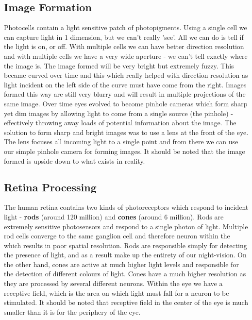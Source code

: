 \documentclass{article}
\begin{document}
	\subsection{Image Formation}
	Photocells contain a light sensitive patch of photopigments. Using a single cell we can capture light in 1 dimension, but we can't really 'see'. All we can do is tell if the light is on, or off. With multiple cells we can have better direction resolution and with multiple cells we have a very wide aperture - we can't tell exactly where the image is. The image formed will be very bright but extremely fuzzy. This became curved over time and this which really helped with direction resolution as light incident on the left side of the curve must have come from the right. Images formed this way are still very blurry and will result in multiple projections of the same image. Over time eyes evolved to become pinhole cameras which form sharp yet dim images by allowing light to come from a single source (the pinhole) - effectively throwing away loads of potential information about the image. The solution to form sharp and bright images was to use a lens at the front of the eye. The lens focuses all incoming light to a single point and from there we can use our simple pinhole camera for forming images. It should be noted that the image formed is upside down to what exists in reality.
	
	\subsection{Retina Processing}
	The human retina contains two kinds of photoreceptors which respond to incident light - \textbf{rods}  (around 120 million) and \textbf{cones} (around 6 million). Rods are extremely sensitive photosensors and respond to a single photon of light. Multiple rod cells converge to the same ganglion cell and therefore neuron within the  which results in poor spatial resolution. Rods are responsible simply for detecting the presence of light, and as a result make up the entirety of our night-vision. On the other hand, cones are active at much higher light levels and responsible for the detection of different colours of light. Cones have a much higher resolution as they are processed by several different neurons. Within the eye we have a receptive field, which is the area on which light must fall for a neuron to be stimulated. It should be noted that receptive field in the center of the eye is much smaller than it is for the periphery of the eye.
	
\end{document}
